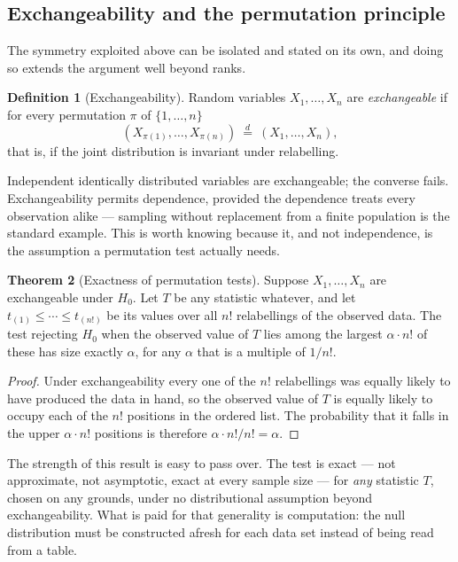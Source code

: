 \documentclass[12pt,a4paper]{report}
\theoremstyle{definition}
\newtheorem{thm}{Theorem}[section]
\newtheorem{defn}[thm]{Definition}
\theoremstyle{plain}
\begin{document}
\subsection*{Exchangeability and the permutation principle}

The symmetry exploited above can be isolated and stated on its own, and doing so
extends the argument well beyond ranks.

\begin{defn}[Exchangeability]
Random variables $X_1,\dots,X_n$ are \emph{exchangeable} if for every
permutation $\pi$ of $\{1,\dots,n\}$
$$\left(X_{\pi(1)},\dots,X_{\pi(n)}\right)\ \overset{d}{=}\ \left(X_1,\dots,X_n\right),$$
that is, if the joint distribution is invariant under relabelling.
\end{defn}

Independent identically distributed variables are exchangeable; the converse
fails. Exchangeability permits dependence, provided the dependence treats every
observation alike --- sampling without replacement from a finite population is
the standard example. This is worth knowing because it, and not independence, is
the assumption a permutation test actually needs.

\begin{thm}[Exactness of permutation tests]
\label{thm:perm}
Suppose $X_1,\dots,X_n$ are exchangeable under $H_0$. Let $T$ be any statistic
whatever, and let $t_{(1)}\leq\cdots\leq t_{(n!)}$ be its values over all $n!$
relabellings of the observed data. The test rejecting $H_0$ when the observed
value of $T$ lies among the largest $\alpha\cdot n!$ of these has size exactly
$\alpha$, for any $\alpha$ that is a multiple of $1/n!$.
\end{thm}

\begin{proof}
Under exchangeability every one of the $n!$ relabellings was equally likely to
have produced the data in hand, so the observed value of $T$ is equally likely
to occupy each of the $n!$ positions in the ordered list. The probability that
it falls in the upper $\alpha\cdot n!$ positions is therefore
$\alpha\cdot n!/n! = \alpha$.
\end{proof}

The strength of this result is easy to pass over. The test is exact --- not
approximate, not asymptotic, exact at every sample size --- for \emph{any}
statistic $T$, chosen on any grounds, under no distributional assumption beyond
exchangeability. What is paid for that generality is computation: the null
distribution must be constructed afresh for each data set instead of being read
from a table.
\end{document}
